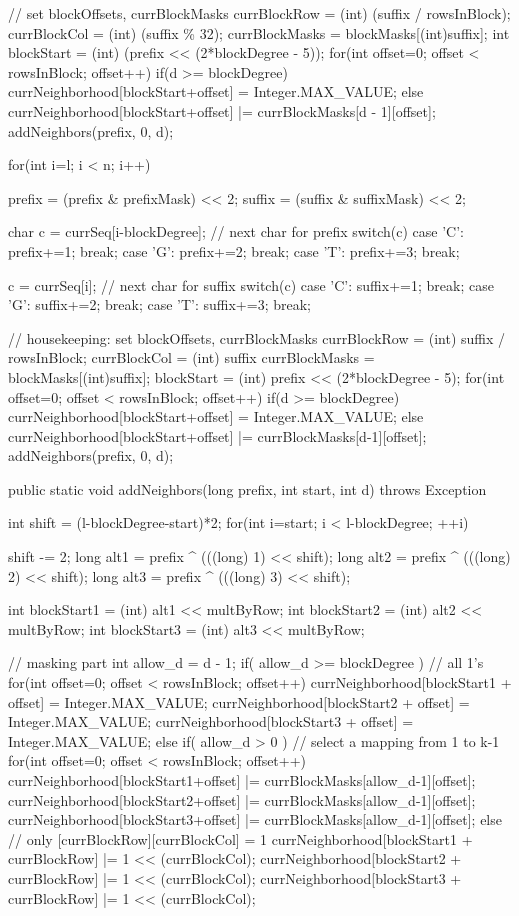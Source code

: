 \documentclass[oneside,12pt]{DISCSthesis}
\begin{document}
{\begin{footnotesize}
\begin{verbatimtab}[2]
{{		// set blockOffsets, currBlockMasks
		currBlockRow = (int) (suffix / rowsInBlock);
		currBlockCol = (int) (suffix \% 32);
		currBlockMasks = blockMasks[(int)suffix];
		int blockStart = (int) (prefix << (2*blockDegree - 5));
		for(int offset=0; offset < rowsInBlock; offset++) {
			if(d >= blockDegree)
				currNeighborhood[blockStart+offset] = Integer.MAX_VALUE;
			else
				currNeighborhood[blockStart+offset]
											 |= currBlockMasks[d - 1][offset];
		}
		addNeighbors(prefix, 0, d);
		
		for(int i=l; i < n; i++) {			
			prefix = (prefix & prefixMask) << 2;
			suffix = (suffix & suffixMask) << 2;

			char c = currSeq[i-blockDegree]; 	// next char for prefix
			switch(c) {
				case 'C': prefix+=1; break;
				case 'G': prefix+=2; break;
				case 'T': prefix+=3; break;
			}

			c = currSeq[i]; 					// next char for suffix
			switch(c) {
				case 'C': suffix+=1; break;
				case 'G': suffix+=2; break;
				case 'T': suffix+=3; break;
			}
			
			// housekeeping: set blockOffsets, currBlockMasks
			currBlockRow = (int) suffix / rowsInBlock;
			currBlockCol = (int) suffix %
			currBlockMasks = blockMasks[(int)suffix];
			blockStart = (int) prefix << (2*blockDegree - 5);
			for(int offset=0; offset < rowsInBlock; offset++) {
				if(d >= blockDegree)
					currNeighborhood[blockStart+offset] = Integer.MAX_VALUE;
				else
					currNeighborhood[blockStart+offset]
											 |= currBlockMasks[d-1][offset];
			}
			addNeighbors(prefix, 0, d);
		}
	}

	public static void addNeighbors(long prefix, 
																	int start, int d) throws Exception {
		int shift = (l-blockDegree-start)*2;
		for(int i=start; i < l-blockDegree; ++i) {
			shift -= 2;
			long alt1 = prefix ^ (((long) 1) << shift);
			long alt2 = prefix ^ (((long) 2) << shift);
			long alt3 = prefix ^ (((long) 3) << shift);

			int blockStart1 = (int) alt1 << multByRow;
			int blockStart2 = (int) alt2 << multByRow;
			int blockStart3 = (int) alt3 << multByRow;

			// masking part
			int allow_d = d - 1;
			if( allow_d >= blockDegree ) {		// all 1's
				for(int offset=0; offset < rowsInBlock; offset++) {
					currNeighborhood[blockStart1 + offset] = Integer.MAX_VALUE;
					currNeighborhood[blockStart2 + offset] = Integer.MAX_VALUE;
					currNeighborhood[blockStart3 + offset] = Integer.MAX_VALUE;
				}
			}
			else if( allow_d > 0 ) {			// select a mapping from 1 to k-1
				for(int offset=0; offset < rowsInBlock; offset++) {
					currNeighborhood[blockStart1+offset]
											 |= currBlockMasks[allow_d-1][offset];
					currNeighborhood[blockStart2+offset]
											 |= currBlockMasks[allow_d-1][offset];
					currNeighborhood[blockStart3+offset]
											 |= currBlockMasks[allow_d-1][offset];
				}
			}
			else {			// only [currBlockRow][currBlockCol] = 1
				currNeighborhood[blockStart1 + currBlockRow] |= 1 << (currBlockCol);
				currNeighborhood[blockStart2 + currBlockRow] |= 1 << (currBlockCol);
				currNeighborhood[blockStart3 + currBlockRow] |= 1 << (currBlockCol);
			}

}}}
\end{verbatimtab}
\end{footnotesize}}
\end{document}
